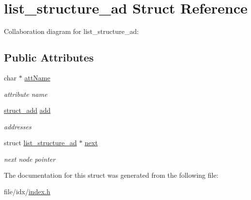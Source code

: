 \hypertarget{structlist__structure__ad}{}\section{list\+\_\+structure\+\_\+ad Struct Reference}
\label{structlist__structure__ad}


Collaboration diagram for list\+\_\+structure\+\_\+ad\+:
\subsection*{Public Attributes}
\begin{DoxyCompactItemize}
\item 
char $\ast$ \hyperlink{structlist__structure__ad_a62a7324920a37f1388600ab02c0fd841}{att\+Name}\hypertarget{structlist__structure__ad_a62a7324920a37f1388600ab02c0fd841}{}\label{structlist__structure__ad_a62a7324920a37f1388600ab02c0fd841}

\begin{DoxyCompactList}\small\item\em attribute name \end{DoxyCompactList}\item 
\hyperlink{structstruct__add}{struct\+\_\+add} \hyperlink{structlist__structure__ad_a0bb6169985f5e52444aa344508cce673}{add}\hypertarget{structlist__structure__ad_a0bb6169985f5e52444aa344508cce673}{}\label{structlist__structure__ad_a0bb6169985f5e52444aa344508cce673}

\begin{DoxyCompactList}\small\item\em addresses \end{DoxyCompactList}\item 
struct \hyperlink{structlist__structure__ad}{list\+\_\+structure\+\_\+ad} $\ast$ \hyperlink{structlist__structure__ad_a5c8aaf39dab4c40186470c6ea0464a23}{next}\hypertarget{structlist__structure__ad_a5c8aaf39dab4c40186470c6ea0464a23}{}\label{structlist__structure__ad_a5c8aaf39dab4c40186470c6ea0464a23}

\begin{DoxyCompactList}\small\item\em next node pointer \end{DoxyCompactList}\end{DoxyCompactItemize}


The documentation for this struct was generated from the following file\+:\begin{DoxyCompactItemize}
\item 
file/idx/\hyperlink{index_8h}{index.\+h}\end{DoxyCompactItemize}
